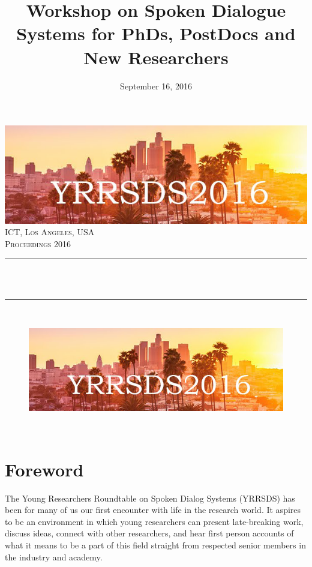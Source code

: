 \documentclass[12pt]{article}
\title{Workshop on Spoken Dialogue Systems for PhDs, PostDocs and New Researchers}								%
\date{September 16, 2016}											%
\makeatletter
\let\thetitle\@title
\let\thedate\@date
\makeatother
\begin{document}

\begin{titlepage}
	\centering
    \vspace*{0.1 cm}
    \includegraphics[scale = 0.8]{yrrsds_logo.png}\\[1.0 cm]
    \textsc{\LARGE ICT, Los Angeles, USA}\\[2.0 cm]
	\textsc{\Large Proceedings 2016}\\[0.5 cm]
	\rule{\linewidth}{0.2 mm} \\[0.4 cm]
	{ \huge \bfseries \thetitle}\\
	\rule{\linewidth}{0.2 mm} \\[1.0 cm]

\begin{figure}[H]
\centering
    \includegraphics[scale=0.4]{yrrsds_logo.png} \\
\end{figure}

	{\large \thedate}\\[2 cm]
\end{titlepage}


\section*{Foreword}
The Young Researchers Roundtable on Spoken Dialog Systems (YRRSDS) has been for many of us our first encounter with life in the research world. It aspires to be an environment in which young researchers can present late-breaking work, discuss ideas, connect with other researchers, and hear first person accounts of what it means to be a part of this field straight from respected senior members in the industry and academy.
\end{document}
